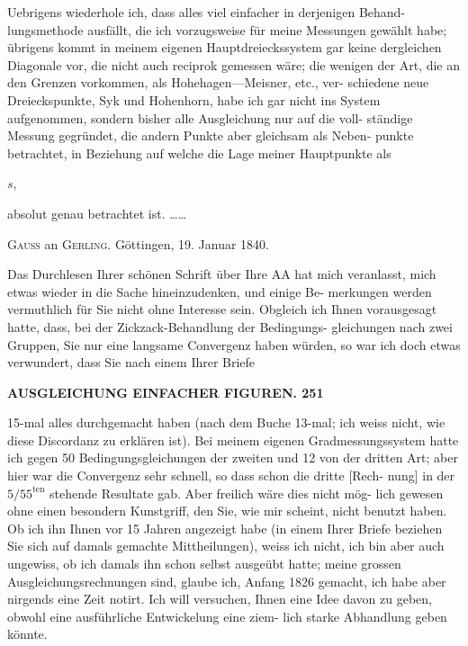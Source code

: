 \documentclass[12pt,a4paper]{article}
\theoremstyle{plain}
\theoremstyle{definition}
\theoremstyle{remark}
\begin{document}
Uebrigens wiederhole ich, dass alles viel einfacher in derjenigen Behand-
lungsmethode ausf\"allt, die ich vorzugsweise f\"ur meine Messungen gew\"ahlt
habe; \"ubrigens kommt in meinem eigenen Hauptdreieckssystem gar keine
dergleichen Diagonale vor, die nicht auch reciprok gemessen w\"are; die wenigen
der Art, die an den Grenzen vorkommen, als Hohehagen---Meisner, etc., ver-
schiedene neue Dreieckspunkte, Syk und Hohenhorn, habe ich gar nicht ins
System aufgenommen, sondern bisher alle Ausgleichung nur auf die voll-
st\"andige Messung gegr\"undet, die andern Punkte aber gleichsam als Neben-
punkte betrachtet, in Beziehung auf welche die Lage meiner Hauptpunkte als

\hfill $s$,

absolut genau betrachtet ist. \ldots\ldots

\medskip

\textsc{Gauss} an \textsc{Gerling}. G\"ottingen, 19. Januar 1840.

\medskip

Das Durchlesen Ihrer sch\"onen Schrift \"uber Ihre AA hat mich
veranlasst, mich etwas wieder in die Sache hineinzudenken, und einige Be-
merkungen werden vermuthlich f\"ur Sie nicht ohne Interesse sein. Obgleich ich
Ihnen vorausgesagt hatte, dass, bei der Zickzack-Behandlung der Bedingungs-
gleichungen nach zwei Gruppen, Sie nur eine langsame Convergenz haben
w\"urden, so war ich doch etwas verwundert, dass Sie nach einem Ihrer Briefe


\newpage

\noindent\textbf{AUSGLEICHUNG EINFACHER FIGUREN. 251}

15-mal alles durchgemacht haben (nach dem Buche 13-mal; ich weiss nicht,
wie diese Discordanz zu erkl\"aren ist). Bei meinem eigenen Gradmessungssystem
hatte ich gegen 50 Bedingungsgleichungen der zweiten und 12 von der dritten
Art; aber hier war die Convergenz sehr schnell, so dass schon die dritte [Rech-
nung] in der $5/55^{\text{ten}}$ stehende Resultate gab. Aber freilich w\"are dies nicht m\"og-
lich gewesen ohne einen besondern Kunstgriff, den Sie, wie mir scheint, nicht
benutzt haben. Ob ich ihn Ihnen vor 15 Jahren angezeigt habe (in einem
Ihrer Briefe beziehen Sie sich auf damals gemachte Mittheilungen), weiss ich
nicht, ich bin aber auch ungewiss, ob ich damals ihn schon selbst ausge\"ubt
hatte; meine grossen Ausgleichungsrechnungen sind, glaube ich, Anfang 1826
gemacht, ich habe aber nirgends eine Zeit notirt. Ich will versuchen, Ihnen
eine Idee davon zu geben, obwohl eine ausf\"uhrliche Entwickelung eine ziem-
lich starke Abhandlung geben k\"onnte.
\end{document}
